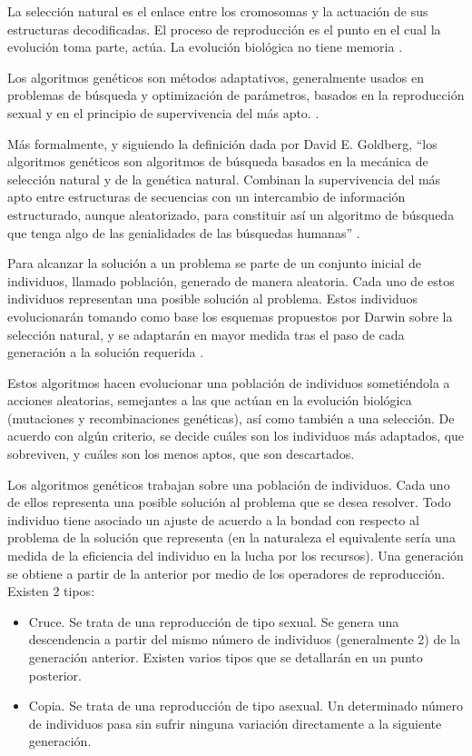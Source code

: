 La selección natural es el enlace entre los cromosomas y la actuación de sus estructuras decodificadas. El proceso de reproducción es el punto en el cual la evolución toma parte, actúa. La evolución biológica no tiene memoria \cite{darwin1859}.

Los algoritmos genéticos son métodos adaptativos, generalmente usados
en problemas de búsqueda y optimización de parámetros, basados en la reproducción sexual y en el principio de supervivencia del más apto. \cite{fogel2000evolutionary} \cite{fogel2006evolutionary}.

Más formalmente, y siguiendo la definición dada por David E. Goldberg, “los algoritmos genéticos son algoritmos de búsqueda basados en la mecánica de selección natural y de la genética natural. Combinan la supervivencia del más apto entre estructuras de secuencias con un intercambio de información estructurado, aunque aleatorizado, para constituir así un algoritmo de búsqueda que tenga algo de las genialidades de las búsquedas humanas” \cite{goldberg1989artificial}.


Para alcanzar la solución a un problema se parte de un conjunto inicial de individuos, llamado población, generado de manera aleatoria. Cada uno de estos individuos representan una posible solución al problema. Estos individuos evolucionarán tomando como base los esquemas propuestos por Darwin sobre la selección natural, y se adaptarán en mayor medida tras el paso de cada generación a la solución requerida \cite{darwin2007}.

Estos algoritmos hacen evolucionar una población de individuos sometiéndola a acciones aleatorias, semejantes a las que actúan en la evolución biológica (mutaciones y recombinaciones genéticas), así como también a una selección. De acuerdo con algún criterio, se decide cuáles son los individuos más adaptados, que sobreviven, y cuáles son los menos aptos, que son descartados.

Los algoritmos genéticos trabajan sobre una población de individuos. Cada uno de ellos representa una posible solución al problema que se desea resolver. Todo individuo tiene asociado un ajuste de acuerdo a la bondad con respecto al problema de la solución que representa (en la naturaleza el equivalente sería una medida de la eficiencia del individuo en la lucha por los recursos). Una generación se obtiene a partir de la anterior por medio de los operadores de reproducción\cite{algGen2014}. Existen 2 tipos:
\begin{itemize}
\item Cruce. Se trata de una reproducción de tipo sexual. Se genera una descendencia a partir del mismo número de individuos (generalmente 2) de la generación anterior. Existen varios tipos que se detallarán en un punto posterior.
\item Copia. Se trata de una reproducción de tipo asexual. Un determinado número de individuos pasa sin sufrir ninguna variación directamente a la siguiente generación.
\end{itemize}


